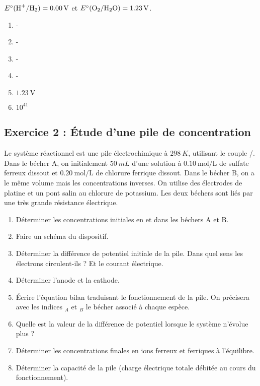  $E^\circ(\ce{H+}/\ce{H2}) = \SI{0.00}{\volt}$ et  $E^\circ(\ce{O2}/\ce{H2O}) = \SI{1.23}{\volt}$.

\begin{enumerate}
	\item -
	\item -
	\item -
	\item -
	\item $\SI{1.23}{\volt}$
	\item $10^{41}$
\end{enumerate}

\subsection{Exercice 2 : Étude d'une pile de concentration}

Le système réactionnel est une pile électrochimique à $\SI{298}{K}$, utilisant le couple /. Dans le bécher A, on  initialement $\SI{50}{mL}$ d'une solution à $\SI{0.10}{\mole\per\liter}$ de sulfate ferreux  dissout et $\SI{0.20}{\mole\per\liter}$ de chlorure ferrique  dissout. Dans le bécher B, on a le même volume mais les concentrations inverses. On utilise des électrodes de platine et un pont salin au chlorure de potassium. Les deux béchers sont liés par une très grande résistance électrique.

\begin{enumerate}
	\item Déterminer les concentrations initiales en  et  dans les  béchers A et B.
	\item Faire un schéma du dispositif.
	\item Déterminer la différence de potentiel initiale de la pile. Dans quel sens les électrons circulent-ils ? Et le courant électrique. 
	\item Déterminer l'anode et la cathode.
	\item Écrire l'équation bilan traduisant le fonctionnement de la pile. On précisera avec les indices $_A$ et $_B$ le bécher associé à chaque espèce.
	\item Quelle est la valeur de la différence de potentiel lorsque le système n'évolue plus ?
	\item Déterminer les concentrations finales en ions ferreux et ferriques à l'équilibre.
	\item Déterminer la capacité de la pile (charge électrique totale débitée au cours du fonctionnement).
\end{enumerate}

